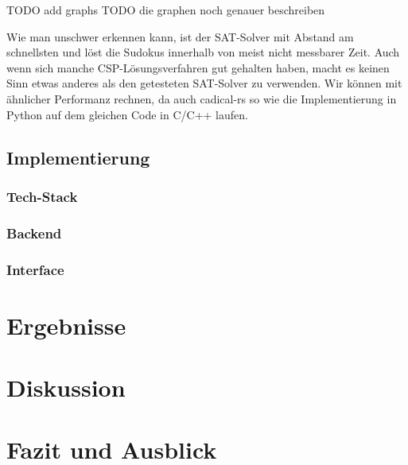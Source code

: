 \documentclass[12pt,a4paper]{article}
\begin{document}
TODO add graphs
TODO die graphen noch genauer beschreiben

Wie man unschwer erkennen kann, ist der SAT-Solver mit Abstand am schnellsten und löst die Sudokus innerhalb von meist nicht messbarer Zeit.
Auch wenn sich manche CSP-Lösungsverfahren gut gehalten haben, macht es keinen Sinn etwas anderes als den getesteten SAT-Solver zu verwenden.
Wir können mit ähnlicher Performanz rechnen, da auch cadical-rs so wie die Implementierung in Python auf dem gleichen Code in C/C++ laufen.

\subsection{Implementierung}

\subsubsection{Tech-Stack}


\subsubsection{Backend}
\subsubsection{Interface}

\section{Ergebnisse}

\section{Diskussion}

\section{Fazit und Ausblick}



\end{document}
